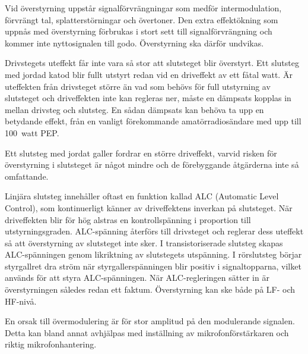 Vid överstyrning uppstår signalförvrängningar som medför intermodulation,
förvrängt tal, splatterstörningar och övertoner.
Den extra effektökning som uppnås med överstyrning förbrukas i stort sett
till signalförvrängning och kommer inte nyttosignalen till godo.
Överstyrning ska därför undvikas.

Drivstegets uteffekt får inte vara så stor att slutsteget blir överstyrt.
Ett slutsteg med jordad katod blir fullt utstyrt redan vid en driveffekt av ett
fåtal watt.
Är uteffekten från drivsteget större än vad som behövs för full utstyrning av
slutsteget och driveffekten inte kan regleras ner, måste en dämpsats
kopplas in mellan drivsteg och slutsteg.
En sådan dämpsats kan behöva ta upp en betydande effekt, från en vanligt
förekommande amatörradiosändare med upp till 100~watt PEP.

Ett slutsteg med jordat galler fordrar en större driveffekt, varvid
risken för överstyrning i slutsteget är något mindre och de
förebyggande åtgärderna inte så omfattande.

Linjära slutsteg innehåller oftast en funktion kallad ALC (Automatic Level
Control), som kontinuerligt känner av driveffektens inverkan på slutsteget.
När driveffekten blir för hög alstras en kontrollspänning i proportion till
utstyrningsgraden.
ALC-spänning återförs till drivsteget och reglerar dess uteffekt så att
överstyrning av slutsteget inte sker.
I transistoriserade slutsteg skapas ALC-spänningen genom likriktning av
slutstegets utspänning.
I rörslutsteg börjar styrgallret dra ström när styrgallerspänningen
blir positiv i signaltopparna, vilket används för att styra ALC-spänningen.
När ALC-regleringen sätter in är överstyrningen således redan ett faktum.
Överstyrning kan ske både på LF- och HF-nivå.

En orsak till övermodulering är för stor amplitud på den modulerande signalen.
Detta kan bland annat avhjälpas med inställning av mikrofonförstärkaren och
riktig mikrofonhantering.
